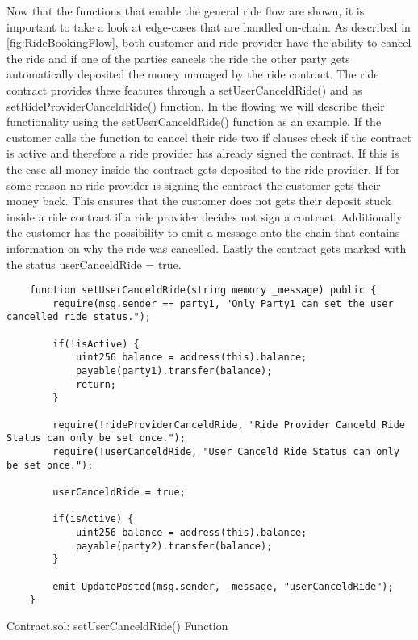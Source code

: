 Now that the functions that enable the general ride flow are shown, it is important to take a look at edge-cases that are handled on-chain. As described in \ref{fig:RideBookingFlow}, both customer and ride provider have the ability to cancel the ride and if one of the parties cancels the ride the other party gets automatically deposited the money managed by the ride contract. The ride contract provides these features through a setUserCanceldRide() and as setRideProviderCanceldRide() function. In the flowing we will describe their functionality using the setUserCanceldRide() function as an example. If the customer calls the function to cancel their ride two if clauses check if the contract is active and therefore a ride provider has already signed the contract. If this is the case all money inside the contract gets deposited to the ride provider. If for some reason no ride provider is signing the contract the customer gets their money back. This ensures that the customer does not gets their deposit stuck inside a ride contract if a ride provider decides not sign a contract. Additionally the customer has the possibility to emit a message onto the chain that contains information on why the ride was cancelled.
Lastly the contract gets marked with the status userCanceldRide = true.

\lstset{
  basicstyle=\footnotesize\ttfamily,
  breaklines=true,
  numbers=left,
  firstnumber=176
}

\begin{Listing}
\begin{lstlisting}
    function setUserCanceldRide(string memory _message) public {
        require(msg.sender == party1, "Only Party1 can set the user cancelled ride status.");
        
        if(!isActive) {
            uint256 balance = address(this).balance;
            payable(party1).transfer(balance);
            return;
        }

        require(!rideProviderCanceldRide, "Ride Provider Canceld Ride Status can only be set once.");
        require(!userCanceldRide, "User Canceld Ride Status can only be set once.");

        userCanceldRide = true;
        
        if(isActive) {
            uint256 balance = address(this).balance;
            payable(party2).transfer(balance);
        }
        
        emit UpdatePosted(msg.sender, _message, "userCanceldRide");
    }
\end{lstlisting}
  \caption{Contract.sol: setUserCanceldRide() Function}
  \label{lst:setUserCanceldRide}
\end{Listing}

